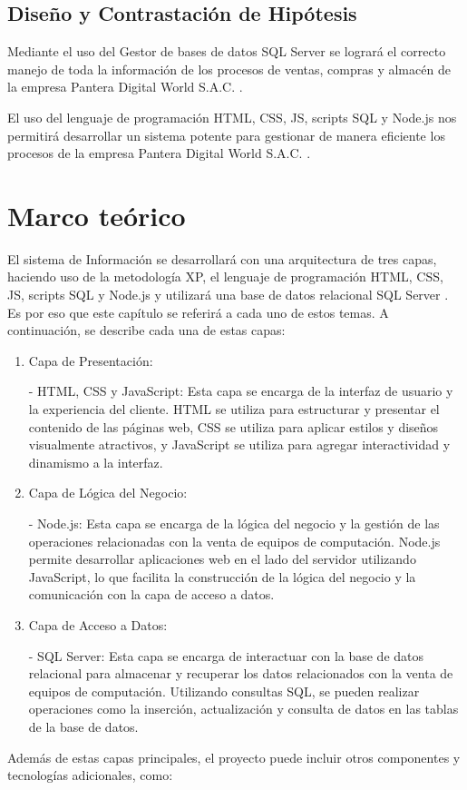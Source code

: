 \documentclass[12pt,a4paper]{article}
\newcommand{\espacio}{\par\vspace{3mm}}
\newcommand{\newsection}[1]{\section{\hspace{4mm} #1}}%
\newcommand{\newsubsection}[1]{\subsection{\hspace{4mm} #1}}
\newcommand{\empresa}{Pantera Digital World S.A.C. }
\newcommand{\basedatos}{SQL Server }
\newcommand{\lenguaje}{HTML, CSS, JS, scripts SQL y Node.js }
\begin{document}
\newsubsection{Diseño y Contrastación de Hipótesis}
Mediante el uso del Gestor de bases de datos \basedatos se logrará el correcto manejo de toda la información de los procesos de ventas, compras y almacén de la empresa \empresa.
\espacio
El uso del lenguaje de programación \lenguaje nos permitirá desarrollar un sistema potente para gestionar de manera eficiente los procesos de la empresa \empresa.

\newpage
\newsection{Marco teórico}
El sistema de Información se desarrollará con una arquitectura de tres capas, haciendo uso de la metodología XP, el lenguaje de programación \lenguaje  y utilizará una base de datos relacional \basedatos. Es por eso que este capítulo se referirá a cada uno de estos temas.
A continuación, se describe cada una de estas capas:
\begin{enumerate} 
    \item Capa de Presentación:\par
    - HTML, CSS y JavaScript: Esta capa se encarga de la interfaz de usuario y la experiencia del cliente. HTML se utiliza para estructurar y presentar el contenido de las páginas web, CSS se utiliza para aplicar estilos y diseños visualmente atractivos, y JavaScript se utiliza para agregar interactividad y dinamismo a la interfaz.
    
    \item Capa de Lógica del Negocio:\par
    - Node.js: Esta capa se encarga de la lógica del negocio y la gestión de las operaciones relacionadas con la venta de equipos de computación. Node.js permite desarrollar aplicaciones web en el lado del servidor utilizando JavaScript, lo que facilita la construcción de la lógica del negocio y la comunicación con la capa de acceso a datos.
    
    \item Capa de Acceso a Datos:\par
    - SQL Server: Esta capa se encarga de interactuar con la base de datos relacional para almacenar y recuperar los datos relacionados con la venta de equipos de computación. Utilizando consultas SQL, se pueden realizar operaciones como la inserción, actualización y consulta de datos en las tablas de la base de datos.
\end{enumerate}
    
Además de estas capas principales, el proyecto puede incluir otros componentes y tecnologías adicionales, como:
\end{document}
